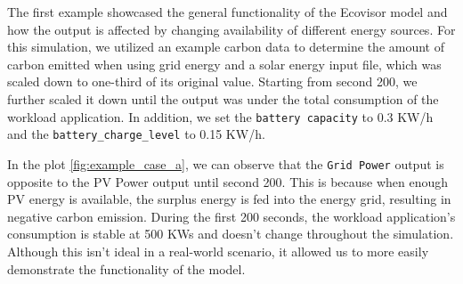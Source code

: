 \begin{figure*}
    \centering
    \caption{Showcase changing Energy Mix}
    \label{fig:example_case_a}
\end{figure*}



The first example showcased the general functionality of the Ecovisor model and
how the output is affected by changing availability of different energy sources.
For this simulation, we utilized an example carbon data to determine the amount
of carbon emitted when using grid energy and a solar energy input file, which
was scaled down to one-third of its original value. Starting from second 200, we
further scaled it down until the output was under the total consumption of the
workload application. In addition, we set the \texttt{battery capacity} to 0.3
KW/h and the \texttt{battery\_charge\_level} to 0.15 KW/h.

In the plot \ref{fig:example_case_a}, we can observe that the \texttt{Grid
Power} output is opposite to the PV Power output until second 200. This is
because when enough PV energy is available, the surplus energy is fed into the
energy grid, resulting in negative carbon emission. During the first 200
seconds, the workload application's consumption is stable at 500 KWs and doesn't
change throughout the simulation. Although this isn't ideal in a real-world
scenario, it allowed us to more easily demonstrate the functionality of the
model.

